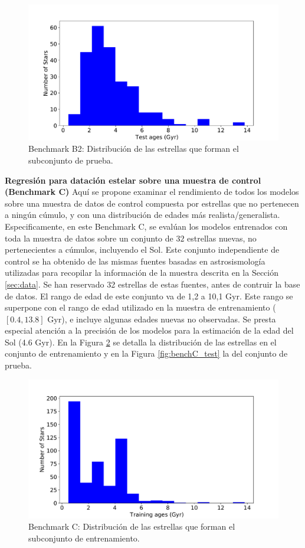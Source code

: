 \begin{figure}[H]
\begin{center}
 \includegraphics[width=0.8\linewidth]{Figuras/Experimentos/B_B2_test.pdf}
\end{center}
\caption{Benchmark B2: Distribución de las estrellas que forman el subconjunto de prueba.}
 \label{fig:benchB2_test}
\end{figure}

\textbf{Regresión para datación estelar sobre una muestra de control (Benchmark C)} {} Aquí se propone examinar el rendimiento de todos los modelos sobre una muestra de datos de control compuesta por estrellas que no pertenecen a ningún cúmulo, y con una distribución de edades más realista/generalista. Especificamente, en este Benchmark C, se evalúan los modelos entrenados con toda la muestra de datos sobre un conjunto de $32$ estrellas nuevas, no pertenecientes a cúmulos, incluyendo el Sol. Este conjunto independiente de control se ha obtenido de las mismas fuentes basadas en astrosismología utilizadas para recopilar la información de la muestra descrita en la Sección \ref{sec:data}. Se han reservado 32 estrellas de estas fuentes, antes de contruir la base de datos. El rango de edad de este conjunto va de 1,2 a 10,1 Gyr. Este rango se superpone con el rango de edad utilizado en la muestra de entrenamiento ($[0.4, 13.8]$ Gyr), e incluye algunas edades nuevas no observadas. Se presta especial atención a la precisión de los modelos para la estimación de la edad del Sol (4.6 Gyr). En la Figura \ref{fig:benchC_train} se detalla la distribución de las estrellas en el conjunto de entrenamiento y en la Figura \ref{fig:benchC_test} la del conjunto de prueba.

\begin{figure}[H]
\begin{center}
 \includegraphics[width=0.8\linewidth]{Figuras/Experimentos/B_C_training.pdf}
\end{center}
\caption{Benchmark C: Distribución de las estrellas que forman el subconjunto de entrenamiento.}
 \label{fig:benchC_train}
\end{figure}

